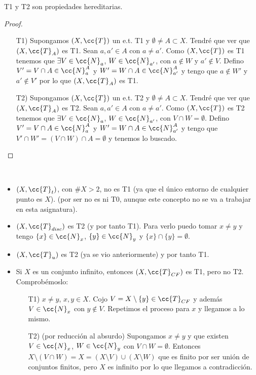 \begin{prop}
    T1 y T2 son propiedades hereditarias.
    \begin{proof}\
        \begin{enumerate}
            \item[T1)] Supongamos $(X, \cc{T})$ un e.t. T1 y $\emptyset \neq A \subset X$. Tendré que ver que $(X, \cc{T}_A)$ es T1. Sean $a,a'\in A$ con $a\neq a'$. Como $(X, \cc{T})$ es T1 tenemos que $\exists V \in \cc{N}_a$, $W\in \cc{N}_{a'}$, con $a \notin W$ y $a' \notin V$. Defino $V'=V\cap A \in \cc{N}_a^A$ y $W'=W\cap A \in \cc{N}_{a'}^A$ y tengo que $a \notin W'$ y $a' \notin V'$ por lo que $(X, \cc{T}_A)$ es T1.
            
            \item[T2)]  Supongamos $(X, \cc{T})$ un e.t. T2 y $\emptyset \neq A \subset X$. Tendré que ver que $(X, \cc{T}_A)$ es T2. Sean $a,a'\in A$ con $a\neq a'$. Como $(X, \cc{T})$ es T2 tenemos que $\exists V \in \cc{N}_a$, $W\in \cc{N}_{a'}$, con $V\cap W = \emptyset$. Defino $V'=V\cap A \in \cc{N}_a^A$ y $W'=W\cap A \in \cc{N}_{a'}^A$ y tengo que $V'\cap W' = (V\cap W)\cap A = \emptyset$ y tenemos lo buscado.
        \end{enumerate}
    \end{proof}
\end{prop}

\begin{ejemplo}\
    \begin{itemize}
        \item $(X, \cc{T}_t)$, con $\#X>2$, no es T1 (ya que el único entorno de cualquier punto es $X$). (por ser no es ni T0, aunque este concepto no se va a trabajar en esta asignatura).
        \item $(X, \cc{T}_{disc})$ es T2 (y por tanto T1). Para verlo puedo tomar $x\neq y$ y tengo $\{x\}\in \cc{N}_x$, $\{y\}\in \cc{N}_y$ y $\{x\}\cap \{y\}= \emptyset$.
        \item $(X, \cc{T}_u)$ es T2 (ya se vio anteriormente) y por tanto T1.
        \item Si $X$ es un conjunto infinito, entonces $(X, \cc{T}_{CF})$ es T1, pero no T2. Comprobémoslo:
        \begin{enumerate}
            \item[T1)] $x\neq y$, $x,y\in X$. Cojo $V=X \setminus \{y\}\in \cc{T}_{CF}$ y además $V\in \cc{N}_x$ con $y\notin V$. Repetimos el proceso para $x$ y llegamos a lo mismo.
            \item[T2)] (por reducción al absurdo) Supongamos $x\neq y$ y que existen $V\in \cc{N}_x$, $W\in \cc{N}_y$ con $V\cap W=\emptyset$. Entonces $X\setminus(V\cap W) = X=(X\setminus V)\cup (X\setminus W)$ que es finito por ser unión de conjuntos finitos, pero $X$ es infinito por lo que llegamos a contradicción. 
        \end{enumerate}
    \end{itemize}
    \endsquare
\end{ejemplo}

